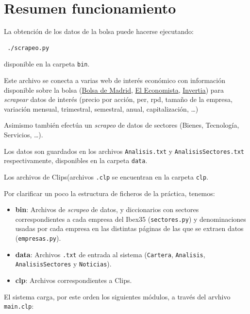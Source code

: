 \documentclass[a4paper,11pt]{article}
\newcommand{\imagent}[4]{
    \begin{figure}
    \begin{center}
    \texttt{[image: \#1]}
    \end{center}
    \caption{#3}
    \label{#4}
  \end{figure}
}
\newcommand{\imagen}[4]{
  \begin{minipage}{\linewidth}
    \centering
    \texttt{[image: \#1]}
    \captionof{figure}{#2}
    \label{#3}
  \end{minipage}
}
\begin{document}
\newpage
\tableofcontents
\newpage

\section{Resumen funcionamiento}
La obtención de los datos de la bolsa puede hacerse ejecutando:

\begin{verbatim}
 ./scrapeo.py
\end{verbatim}

disponible en la carpeta \texttt{bin}.

Este archivo se conecta a varias web de interés económico con información disponible sobre la bolsa 
(\href{http://www.bolsamadrid.es}{Bolsa de Madrid}, \href{http://www.eleconomista.es}{El Economista},
\href{http://www.invertia.com/}{Invertia}) para \textit{scrapear} datos de interés (precio por acción,
per, rpd, tamaño de la empresa, variación mensual, trimestral, semestral, anual, capitalización, \ldots) 

Asimismo también efectúa un \textit{scrapeo} de datos de sectores (Bienes, Tecnología, Servicios, \ldots).

Los datos son guardados en los archivos \texttt{Analisis.txt} y \texttt{AnalisisSectores.txt} respectivamente,
disponibles en la carpeta \texttt{data}.

Los archivos de Clips(archivos \texttt{.clp} se encuentran en la carpeta \texttt{clp}.

Por clarificar un poco la estructura de ficheros de la práctica, tenemos:
\begin{itemize}
 \item \textbf{bin}: Archivos de \textit{scrapeo} de datos, y diccionarios con sectores correspondientes a cada empresa 
 del Ibex35 (\texttt{sectores.py}) y denominaciones usadas por cada empresa en las distintas páginas de las que se
 extraen datos (\texttt{empresas.py}).
 \item \textbf{data}: Archivos \texttt{.txt} de entrada al sistema (\texttt{Cartera}, \texttt{Analisis}, 
 \texttt{AnalisisSectores} y \texttt{Noticias}).
 \item \textbf{clp}: Archivos correspondientes a Clips.
\end{itemize}


El sistema carga, por este orden los siguientes módulos, a través del arvhivo \texttt{main.clp}:
\end{document}
